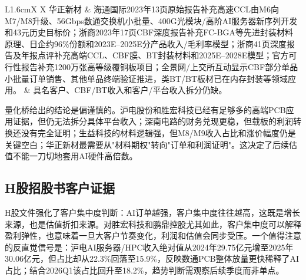 \begin{exhibitbox}
\begin{tabularx}{\textwidth}{L{1.6cm}X X}
华正新材 & 海通国际2023年13页原始报告补充高速CCL由M6向M7/M8升级、56Gbps数通交换机小批量、400G光模块/高阶AI服务器新序列开发和43元历史目标价；浙商2023年17页CBF深度报告补充FC-BGA等先进封装材料原理、日企约96\%份额和2023E--2025E分产品收入/毛利率模型；浙商41页深度报告及年报点评补充高端CCL、CBF膜、BT封装材料和2025E--2028E模型；官方可行性报告补充1200万张高等级覆铜板项目；全景网/上交所互动显示CBF部分单品小批量订单销售、其他单品终端验证推进，类BT/BT板材已在内存封装等领域应用。 & 具名客户、CBF/BT收入和客户/平台收入拆分仍缺。 \\
\bottomrule
\end{tabularx}
\end{exhibitbox}

量化桥给出的结论是偏谨慎的。沪电股份和胜宏科技已经有足够多的高端PCB应用证据，但仍无法拆分具体平台收入；深南电路的财务兑现更稳，但载板的利润转换还没有完全证明；生益科技的材料逻辑强，但M8/M9收入占比和涨价幅度仍是关键空白；华正新材最需要从"材料期权"转向"订单和利润证明"。这决定了后续估值不能一刀切地套用AI硬件高倍数。

\subsection{H股招股书客户证据}

H股文件强化了客户集中度判断：AI订单越强，客户集中度往往越高，这既是增长来源，也是估值折扣来源。对胜宏科技和鹏鼎控股尤其如此，客户集中度可以解释盈利弹性，也意味着一旦大客户节奏变化，利润和估值会同步受压。一个值得注意的反直觉信号是：沪电AI服务器/HPC收入绝对值从2024年29.75亿元增至2025年30.06亿元，但占比却从22.3\%回落至15.9\%，反映数通PCB整体放量更快稀释了AI占比；结合2026Q1该占比回升至18.2\%，趋势判断需观察后续季度而非单点。

